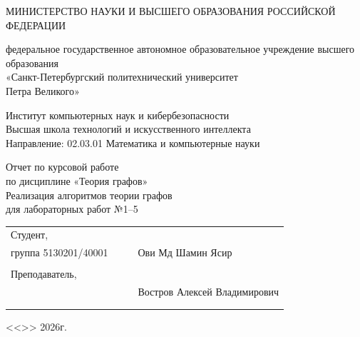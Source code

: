 \documentclass[a4paper,final]{article}
\begin{document}
	\begin{center}
		\normalsize\bf{{МИНИСТЕРСТВО НАУКИ И ВЫСШЕГО ОБРАЗОВАНИЯ РОССИЙСКОЙ ФЕДЕРАЦИИ}

			\hfill \break
			федеральное государственное автономное образовательное учреждение высшего образования\\ «Санкт-Петербургский политехнический университет\\ Петра Великого»\\[10pt]}
		\hfill \break
		\normalsize{Институт компьютерных наук и кибербезопасности}\\[10pt]

		\normalsize{Высшая школа технологий и искусственного интеллекта}\\[10pt]

		\normalsize{Направление: 02.03.01 Математика и компьютерные науки}\\
		\vspace{50pt}

		\vspace{1pt}
		\begin{center}
Отчет по курсовой работе\\
по дисциплине «Теория графов»\\
Реализация алгоритмов теории графов\\
для лабораторных работ №1--5

		\end{center}

		\hfill \break
		\hfill \break
	\end{center}
	\small{ \bf
		\begin{tabular}{lrrl}
			\!\!\!Студент, & \hspace{0cm} & & \\
			\!\!\!группа 5130201/40001 & \hspace{1.5cm} & \underline{\hspace{3cm}} & \hspace{-0.3cm}Ови Мд Шамин Ясир  \\\\
			\!\!\!Преподаватель, & \hspace{1cm} & \\
			\!\!\! & \hspace{0.1cm} & \underline{\hspace{3cm}} &  Востров Алексей Владимирович\\\\
			&&\hspace{3.5cm}
		\end{tabular}
		\begin{flushright}
			<<\underline{\hspace{1cm}}>>\underline{\hspace{2.5cm}} 2026г.
		\end{flushright}
	}
\end{document}
